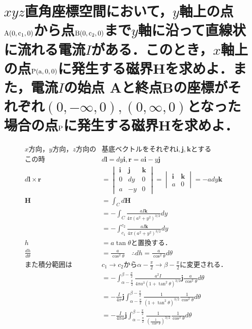 \documentclass[dvipdfmx]{ujarticle}
\begin{document}
\section{$xyz$直角座標空間において，$y$軸上の点$\rm{A}(0, c_{1}, 0)$から点$\rm{B}(0, c_{2}, 0)$まで$y$軸に沿って直線状に流れる電流$I$がある．このとき，$x$軸上の点$\rm{P}(a, 0, 0)$に発生する磁界$\boldsymbol{H}$を求めよ．また，電流$I$の始点 Aと終点Bの座標がそれぞれ$(0, -\infty, 0), (0, \infty, 0)$となった場合の点$\rm{P}$に発生する磁界$\boldsymbol{H}$を求めよ．}
\begin{align*}
	x方向，y方向，z方向の&基底ベクトルをそれぞれ\boldsymbol{i},\boldsymbol{j},\boldsymbol{k}とする\\
	この時&d\boldsymbol{l}=dy\boldsymbol{i}, \boldsymbol{r}=a\boldsymbol{i}-y\boldsymbol{j}\\
	d\boldsymbol{l}\times \boldsymbol{r}&=
	\begin{vmatrix}
	\boldsymbol{i} & \boldsymbol{j} & \boldsymbol{k}\\
	0 &dy & 0\\
	a & -y &0
	\end{vmatrix}
	=
	\begin{vmatrix}
	\boldsymbol{i}  & \boldsymbol{k}\\
	a & 0
	\end{vmatrix}
	=-ady\boldsymbol{k}\\
	\boldsymbol{H}&=\int_{C} d\boldsymbol{H}\\
	&=-\int_{C} \frac{aI\boldsymbol{k}}{4\pi(a^{2}+y^{2})^{3/2}}dy\\
	&=-\int_{c_{1}}^{c_{2}} \frac{aI\boldsymbol{k}}{4\pi(a^{2}+y^{2})^{3/2}}dy\\
	h&=a\tan \theta と置換する．\\
	\frac{dh}{d\theta}&=\frac{a}{\cos ^{2}\theta } \quad \therefore dh=\frac{a}{\cos ^{2}\theta }d\theta \\
	また積分範囲は&c_{1}\to c_{2}から\alpha-\frac{\pi}{2} \to \beta -\frac{\pi}{2}に変更される．\\
	&=-\int_{\alpha-\frac{\pi}{2}}^{\beta -\frac{\pi}{2}} \frac{a^{2}I}{4\pi a^{3}(1+\tan^{2}\theta)^{3/2}}\boldsymbol{j} \frac{a}{\cos ^{2}\theta }d\theta\\
	&=-\frac{I}{4\pi} \boldsymbol{j} \int_{\alpha-\frac{\pi}{2}}^{\beta -\frac{\pi}{2}} \frac{1}{(1+\tan^{2}\theta)^{3/2}} \frac{1}{\cos ^{2}\theta }d\theta\\
	&=-\frac{I}{4\pi a} \boldsymbol{j} \int_{\alpha-\frac{\pi}{2}}^{\beta -\frac{\pi}{2}} \frac{1}{(\frac{1}{\cos^{2} \theta })^{3/2}} \frac{1}{\cos ^{2}\theta }d\theta\\

\end{align*}
\end{document}
